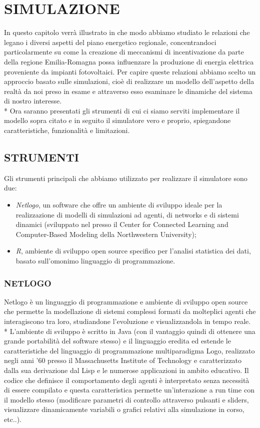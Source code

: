 \documentclass[12pt,a4paper,openright,twoside]{report}
\begin{document}
\chapter{SIMULAZIONE}

In questo capitolo verrà illustrato in che modo abbiamo studiato le relazioni che legano i diversi aspetti del piano energetico regionale, concentrandoci particolarmente su come la creazione di meccanismi di incentivazione da parte della regione Emilia-Romagna possa influenzare la produzione di energia elettrica proveniente da impianti fotovoltaici.
Per capire queste relazioni abbiamo scelto un approccio basato sulle simulazioni, cioè di realizzare un modello dell'aspetto della realtà da noi preso in esame e attraverso esso esaminare le dinamiche del sistema di nostro interesse.
\\*
Ora saranno presentati gli strumenti di cui ci siamo serviti implementare il modello sopra citato e in seguito il simulatore vero e proprio, spiegandone caratteristiche, funzionalità e limitazioni.

\section{STRUMENTI}

Gli strumenti principali che abbiamo utilizzato per realizzare il simulatore sono due:\begin{itemize}
	\item \emph{Netlogo}, un software che offre un ambiente di sviluppo ideale per la realizzazione di modelli di simulazioni ad agenti, di networks e di sistemi dinamici (sviluppato nel presso il Center for Connected Learning and Computer-Based Modeling della Northwestern University);
	\item \emph{R}, ambiente di sviluppo open source specifico per l'analisi statistica dei dati, basato sull'omonimo linguaggio di programmazione.
\end{itemize}

\subsection{NETLOGO}

Netlogo è un linguaggio di programmazione e ambiente di sviluppo open source che permette la modellazione di sistemi complessi formati da molteplici agenti che interagiscono tra loro, studiandone l'evoluzione  e visualizzandola in tempo reale.
\\* L'ambiente di sviluppo è scritto in Java (con il vantaggio quindi di ottenere una grande portabilità del software stesso) e il linguaggio eredita ed estende le caratteristiche del linguaggio di programmazione multiparadigma Logo, realizzato negli anni '60 presso il Massachusetts Institute of Technology e caratterizzato dalla sua derivazione dal Lisp e le numerose applicazioni in ambito educativo. Il codice che definisce il comportamento degli agenti è interpretato senza necessità di essere compilato e questa caratteristica permette un'interazione a run time con il modello stesso (modificare parametri di controllo attraverso pulsanti e sliders, visualizzare dinamicamente variabili o grafici relativi alla simulazione in corso, etc..).
\end{document}
